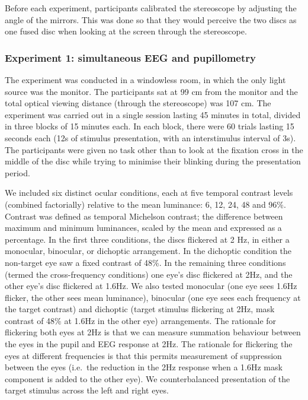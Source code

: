 \documentclass[
]{article}
\begin{document}
Before each experiment, participants calibrated the stereoscope by adjusting the angle of the mirrors. This was done so that they would perceive the two discs as one fused disc when looking at the screen through the stereoscope.

\hypertarget{experiment-1-simultaneous-eeg-and-pupillometry}{%
\subsubsection{Experiment 1: simultaneous EEG and pupillometry}\label{experiment-1-simultaneous-eeg-and-pupillometry}}

The experiment was conducted in a windowless room, in which the only light source was the monitor. The participants sat at 99 cm from the monitor and the total optical viewing distance (through the stereoscope) was 107 cm. The experiment was carried out in a single session lasting 45 minutes in total, divided in three blocks of 15 minutes each. In each block, there were 60 trials lasting 15 seconds each (12s of stimulus presentation, with an interstimulus interval of 3s). The participants were given no task other than to look at the fixation cross in the middle of the disc while trying to minimise their blinking during the presentation period.

We included six distinct ocular conditions, each at five temporal contrast levels (combined factorially) relative to the mean luminance: 6, 12, 24, 48 and 96\%. Contrast was defined as temporal Michelson contrast; the difference between maximum and minimum luminances, scaled by the mean and expressed as a percentage. In the first three conditions, the discs flickered at 2 Hz, in either a monocular, binocular, or dichoptic arrangement. In the dichoptic condition the non-target eye saw a fixed contrast of 48\%. In the remaining three conditions (termed the cross-frequency conditions) one eye's disc flickered at 2Hz, and the other eye's disc flickered at 1.6Hz. We also tested monocular (one eye sees 1.6Hz flicker, the other sees mean luminance), binocular (one eye sees each frequency at the target contrast) and dichoptic (target stimulus flickering at 2Hz, mask contrast of 48\% at 1.6Hz in the other eye) arrangements. The rationale for flickering both eyes at 2Hz is that we can measure summation behaviour between the eyes in the pupil and EEG response at 2Hz. The rationale for flickering the eyes at different frequencies is that this permits measurement of suppression between the eyes (i.e.~the reduction in the 2Hz response when a 1.6Hz mask component is added to the other eye). We counterbalanced presentation of the target stimulus across the left and right eyes.
\end{document}
